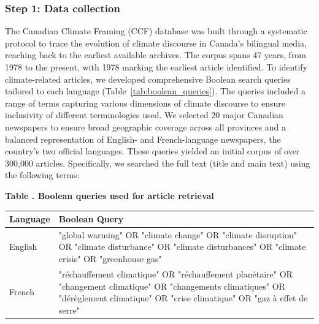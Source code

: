\subsubsection{Step 1: Data collection}

The Canadian Climate Framing (CCF) database was built through a systematic protocol to trace the evolution of climate discourse in Canada’s bilingual media, reaching back to the earliest available archives. The corpus spans 47 years, from 1978 to the present, with 1978 marking the earliest article identified. To identify climate-related articles, we developed comprehensive Boolean search queries tailored to each language (Table~\ref{tab:boolean_queries}). The queries included a range of terms capturing various dimensions of climate discourse to ensure inclusivity of different terminologies used. We selected 20 major Canadian newspapers to ensure broad geographic coverage across all provinces and a balanced representation of English- and French-language newspapers, the country’s two official languages. These queries yielded an initial corpus of over 300,000 articles. Specifically, we searched the full text (title and main text) using the following terms:

\begin{center}
\begingroup
{}\label{tab:boolean_queries}
\begin{minipage}{0.95\linewidth}
\centering
\setlength{\tabcolsep}{8pt}
\renewcommand{\arraystretch}{1.25}
\textbf{Table \thetable. Boolean queries used for article retrieval}
\vspace{0.5em}

{\fontsize{10}{12}\selectfont
\begin{tabular}{>{\raggedright\arraybackslash}p{2.8cm} >{\raggedright\arraybackslash}p{12cm}}
\toprule
\textbf{Language} & \textbf{Boolean Query} \\
\midrule
English & "global warming" OR "climate change" OR "climate disruption" OR "climate disturbance" OR "climate disturbances" OR "climate crisis" OR "greenhouse gas" \\
French & "réchauffement climatique" OR "réchauffement planétaire" OR "changement climatique" OR "changements climatiques" OR "dérèglement climatique" OR "crise climatique" OR "gaz à effet de serre" \\
\bottomrule
\end{tabular}
}
\end{minipage}
\endgroup
\end{center}


